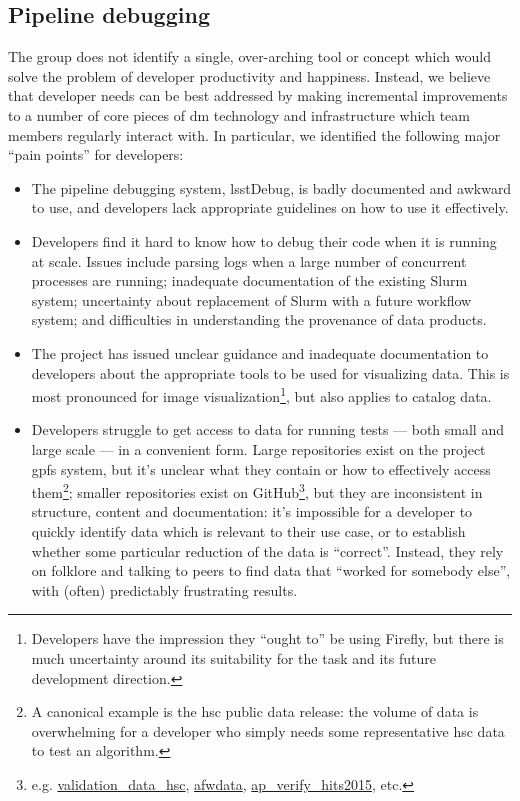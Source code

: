 \subsection{Pipeline debugging}
\label{sec:design:debug}

The group does not identify a single, over-arching tool or concept which would
solve the problem of developer productivity and happiness. Instead, we believe
that developer needs can be best addressed by making incremental improvements
to a number of core pieces of \gls{dm} technology and infrastructure which
team members regularly interact with. In particular, we identified the
following major ``pain points'' for developers:

\begin{itemize}

  \item{The pipeline debugging system, lsstDebug, is badly documented and
  awkward to use, and developers lack appropriate guidelines on how to use it
  effectively.}

  \item{Developers find it hard to know how to debug their code when it is
  running at scale. Issues include parsing logs when a large number of
  concurrent processes are running; inadequate documentation of the existing
  Slurm system; uncertainty about replacement of Slurm with a future workflow
  system; and difficulties in understanding the provenance of data products.}

  \item{The project has issued unclear guidance and inadequate documentation
  to developers about the appropriate tools to be used for visualizing data.
  This is most pronounced for image visualization\footnote{Developers have the
  impression they ``ought to'' be using Firefly, but there is much uncertainty
  around its suitability for the task and its future development direction.},
  but also applies to catalog data.}

  \item{Developers struggle to get access to data for running tests --- both
  small and large scale --- in a convenient form. Large repositories exist on
  the project \gls{gpfs} system, but it's unclear what they contain or how
  to effectively access them\footnote{A canonical example is the \gls{hsc}
  public data release: the volume of data is overwhelming for a developer who
  simply needs some representative \gls{hsc} data to test an algorithm.};
  smaller repositories exist on GitHub\footnote{e.g.
  \href{https://github.com/lsst/validation_data_hsc}{validation\_data\_hsc},
  \href{https://github.com/lsst/afwdata}{afwdata},
  \href{https://github.com/lsst/ap_verify_hits2015}{ap\_verify\_hits2015},
  etc.}, but they are inconsistent in structure, content and documentation:
  it's impossible for a developer to quickly identify data which is relevant
  to their use case, or to establish whether some particular reduction of the
  data is ``correct''. Instead, they rely on folklore and talking to peers to
  find data that ``worked for somebody else'', with (often) predictably
  frustrating results.}

\end{itemize}

